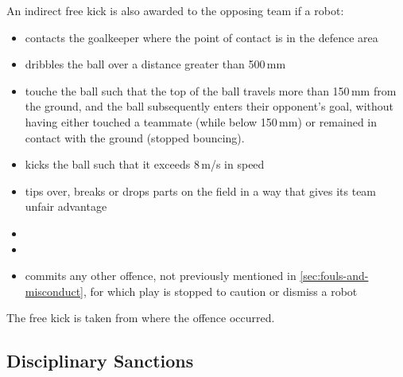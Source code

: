 An indirect free kick is also awarded to the opposing team if a robot:
\begin{itemize}
\item contacts the goalkeeper where the point of contact is in the defence area
\item dribbles the ball over a distance greater than 500\,mm
\item touche the ball such that the top of the ball travels more than 150\,mm from the ground, and the ball subsequently enters their opponent's goal, without having either touched a teammate (while below 150\,mm) or remained in contact with the ground (stopped bouncing).
\item kicks the ball such that it exceeds 8\,m/s in speed
\item tips over, breaks or drops parts on the field in a way that gives its team unfair advantage
\item {}
\item {}
\item commits any other offence, not previously mentioned in \autoref{sec:fouls-and-misconduct}, for which play is stopped to caution or dismiss a robot
\end{itemize}

The free kick is taken from where the offence occurred.

\subsection{Disciplinary Sanctions}\label{subsec:fouls-and-misconduct-disciplinary-sanctions}
